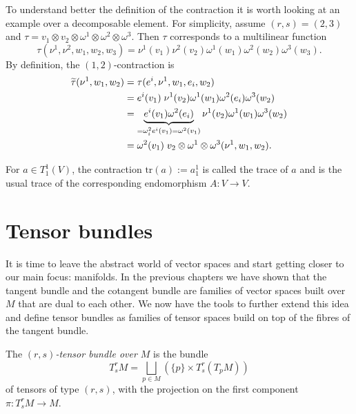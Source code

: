 \begin{example}
  To understand better the definition of the contraction it is worth looking at an example over a decomposable element.
  For simplicity, assume $(r,s) = (2,3)$ and $\tau = v_1\otimes v_2\otimes\omega^1\otimes\omega^2\otimes\omega^3$.
  Then $\tau$ corresponds to a multilinear function
  \begin{equation}
    \tau(\nu^1,\nu^2,w_1,w_2,w_3) = \nu^1(v_1)\nu^2(v_2)\omega^1(w_1)\omega^2(w_2)\omega^3(w_3).
  \end{equation}
  By definition, the $(1,2)$-contraction is
  \begin{align}
    \widetilde\tau(\nu^1,w_1,w_2) & = \tau(e^i,\nu^1,w_1,e_i,w_2) \\
                                  & = e^i(v_1)\;\nu^1(v_2)\omega^1(w_1)\omega^2(e_i)\omega^3(w_2) \\
                                  & = \LaTeXunderbrace{e^i(v_1)\omega^2(e_i)}_{=\omega^2_i e^i (v_1) =\omega^2(v_1)}\nu^1(v_2)\omega^1(w_1)\omega^3(w_2) \\
                                  & = \omega^2(v_1)\; v_2\otimes\omega^1\otimes\omega^3 (\nu^1,w_1,w_2).
  \end{align}
\end{example}

\begin{example}
  For $a\in T_1^1(V)$, the contraction $\mathrm{tr} (a) := a^1_1$ is called the trace of $a$ and is the usual trace of the corresponding endomorphism $A:V\to V$.
\end{example}

\section{Tensor bundles}

It is time to leave the abstract world of vector spaces and start getting closer to our main focus: manifolds.
In the previous chapters we have shown that the tangent bundle and the cotangent bundle are families of vector spaces built over $M$ that are dual to each other.
We now have the tools to further extend this idea and define tensor bundles as families of tensor spaces build on top of the fibres of the tangent bundle.

\begin{definition}
  The \emph{$(r,s)$-tensor bundle over $M$} is the bundle
  \begin{equation}
    T_s^r M = \bigsqcup_{p\in M}\left(\{p\}\times T_s^r(T_p M)\right)
  \end{equation}
  of tensors of type $(r,s)$, with the projection on the first component $\pi:T_s^r M\to M$.
\end{definition}

